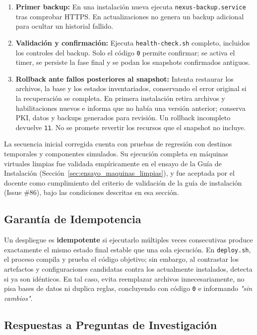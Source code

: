 \documentclass[10pt,a4paper]{article}
\begin{document}
\begin{enumerate}[leftmargin=*]
    \item \textbf{Primer backup:} En una instalación nueva ejecuta \texttt{nexus-backup.service} tras comprobar HTTPS. En actualizaciones no genera un backup adicional para ocultar un historial fallido.
    \item \textbf{Validación y confirmación:} Ejecuta \texttt{health-check.sh} completo, incluidos los controles del backup. Solo el código \texttt{0} permite confirmar; se activa el timer, se persiste la fase final y se podan los snapshots confirmados antiguos.
    \item \textbf{Rollback ante fallos posteriores al snapshot:} Intenta restaurar los archivos, la base y los estados inventariados, conservando el error original si la recuperación se completa. En primera instalación retira archivos y habilitaciones nuevos e informa que no había una versión anterior; conserva PKI, datos y backups generados para revisión. Un rollback incompleto devuelve \texttt{11}. No se promete revertir los recursos que el snapshot no incluye.
\end{enumerate}

La secuencia inicial corregida cuenta con pruebas de regresión con destinos temporales y componentes simulados. Su ejecución completa en máquinas virtuales limpias fue validada empíricamente en el ensayo de la Guía de Instalación (Sección~\ref{sec:ensayo_maquinas_limpias}), y fue aceptada por el docente como cumplimiento del criterio de validación de la guía de instalación (Issue \#86), bajo las condiciones descritas en esa sección.

\subsection{Garantía de Idempotencia}

Un despliegue es \textbf{idempotente} si ejecutarlo múltiples veces consecutivas produce exactamente el mismo estado final estable que una sola ejecución. En \texttt{deploy.sh}, el proceso compila y prueba el código objetivo; sin embargo, al contrastar los artefactos y configuraciones candidatas contra los actualmente instalados, detecta si ya son idénticos. En tal caso, evita reemplazar archivos innecesariamente, no pisa bases de datos ni duplica reglas, concluyendo con código \texttt{0} e informando \textit{"sin cambios"}.

\subsection{Respuestas a Preguntas de Investigación}
\end{document}
